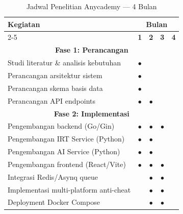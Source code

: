 \begin{table}[H]
	\centering
	\caption{Jadwal Penelitian Anycademy --- 4 Bulan}
	\begin{tabular}{|l|c|c|c|c|}
		\hline
		\multirow{2}{*}{\textbf{Kegiatan}}     & \multicolumn{4}{c|}{\textbf{Bulan}}                                        \\
		\cline{2-5}
		                                       & \textbf{1}                          & \textbf{2} & \textbf{3} & \textbf{4} \\
		\hline
		\multicolumn{5}{|c|}{\textbf{Fase 1: Perancangan}}                                                                  \\
		\hline
		Studi literatur \& analisis kebutuhan  & $\bullet$                           &            &            &            \\
		\hline
		Perancangan arsitektur sistem          & $\bullet$                           &            &            &            \\
		\hline
		Perancangan skema basis data           & $\bullet$                           &            &            &            \\
		\hline
		Perancangan API endpoints              & $\bullet$                           & $\bullet$  &            &            \\
		\hline
		\hline
		\multicolumn{5}{|c|}{\textbf{Fase 2: Implementasi}}                                                                 \\
		\hline
		Pengembangan backend (Go/Gin)          & $\bullet$                           & $\bullet$  & $\bullet$  &            \\
		\hline
		Pengembangan IRT Service (Python)      & $\bullet$                           & $\bullet$  &            &            \\
		\hline
		Pengembangan AI Service (Python)       & $\bullet$                           & $\bullet$  &            &            \\
		\hline
		Pengembangan frontend (React/Vite)     & $\bullet$                           & $\bullet$  & $\bullet$  &            \\
		\hline
		Integrasi Redis/Asynq queue            &                                     & $\bullet$  & $\bullet$  &            \\
		\hline
		Implementasi multi-platform anti-cheat &                                     & $\bullet$  & $\bullet$  &            \\
		\hline
		Deployment Docker Compose              &                                     & $\bullet$  & $\bullet$  &            \\

\end{tabular}
\end{table}

